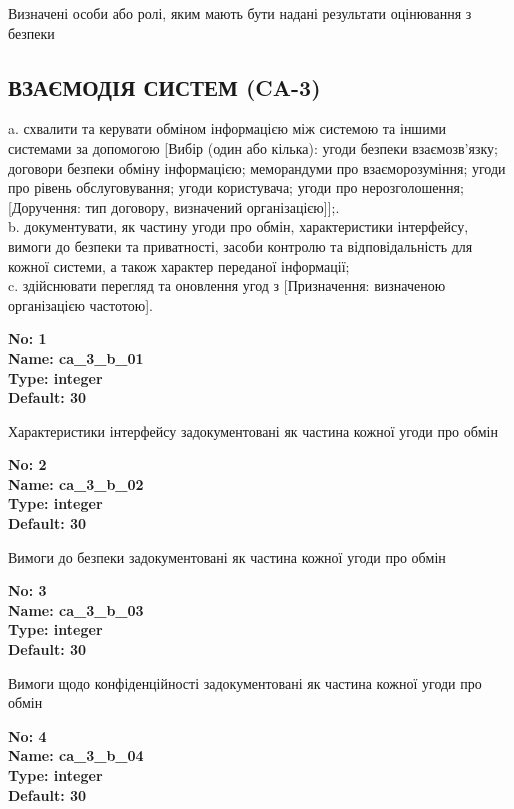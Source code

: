 \documentclass{article}
\begin{document}
{\footnotesize Визначені особи або ролі, яким мають бути надані результати оцінювання з безпеки}




\subsection{ВЗАЄМОДІЯ СИСТЕМ (CA-3)}
a. схвалити та керувати обміном інформацією між системою та іншими системами за допомогою [Вибір (один або кілька): угоди безпеки взаємозв'язку; договори безпеки обміну інформацією; меморандуми про взаєморозуміння; угоди про рівень обслуговування; угоди користувача; угоди про нерозголошення; [Доручення: тип договору, визначений організацією]];.\\ 
b. документувати, як частину угоди про обмін, характеристики інтерфейсу, вимоги до безпеки та приватності, засоби контролю та відповідальність для кожної системи, а також характер переданої інформації;\\ 
c. здійснювати перегляд та оновлення угод з [Призначення: визначеною організацією частотою].

\vspace{10pt}
{\footnotesize\bfseries
No: 1\\
Name: ca\_\allowbreak{}3\_\allowbreak{}b\_\allowbreak{}01\\
Type: integer\\
Default: 30
}

{\footnotesize Характеристики інтерфейсу задокументовані як частина кожної угоди про обмін}


{\footnotesize\bfseries
No: 2\\
Name: ca\_\allowbreak{}3\_\allowbreak{}b\_\allowbreak{}02\\
Type: integer\\
Default: 30
}

{\footnotesize Вимоги до безпеки задокументовані як частина кожної угоди про обмін}


{\footnotesize\bfseries
No: 3\\
Name: ca\_\allowbreak{}3\_\allowbreak{}b\_\allowbreak{}03\\
Type: integer\\
Default: 30
}

{\footnotesize Вимоги щодо конфіденційності задокументовані як частина кожної угоди про обмін}


{\footnotesize\bfseries
No: 4\\
Name: ca\_\allowbreak{}3\_\allowbreak{}b\_\allowbreak{}04\\
Type: integer\\
Default: 30
}
\end{document}
